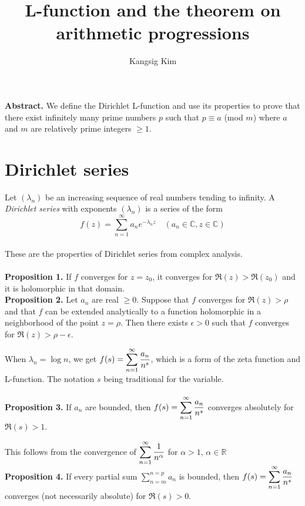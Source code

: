 \documentclass[11pt]{article}
\title{L-function and the theorem on arithmetic progressions}
\author{Kangsig Kim}
\begin{document}
\maketitle
\textbf{Abstract.} We define the Dirichlet L-function and use its properties to prove that there exist infinitely many prime numbers $p$ such that $p\equiv a$ (mod $m$) where $a$ and $m$ are relatively prime integers $\geq1$.
\vspace{10mm}

\section{Dirichlet series}
Let $(\lambda_n)$ be an increasing sequence of real numbers tending to infinity. A \textit{Dirichlet series} with exponents $(\lambda_n)$ is a series of the form
\begin{equation*}
    f(z)=\displaystyle\sum_{n=1}^{\infty} a_n e^{-\lambda_n z} \quad (a_n\in \mathbb{C}, z\in \mathbb{C})
\end{equation*}
\\
These are the properties of Dirichlet series from complex analysis.
\\
\\
\textbf{Proposition 1.}
If $f$ converges for $z=z_0$, it converges for $\Re(z)>\Re(z_0)$ and it is holomorphic in that domain.
\vspace{7mm}
\\
\textbf{Proposition 2.}
Let $a_n$ are real $\geq0$. Suppose that $f$ converges for $\Re(z)>\rho$ and that $f$ can be extended analytically to a function holomorphic in a neighborhood of the point $z=\rho$. Then there exists $\epsilon>0$ such that $f$ converges for $\Re(z)>\rho-\epsilon$.
\vspace{10mm}

When $\lambda_n=\log n$, we get $f(s)=\displaystyle\sum_{n=1}^{\infty} {a_n\over n^s}$, which is a form of the zeta function and L-function. The notation $s$ being traditional for the variable.
\\
\\
\textbf{Proposition 3.}
If $a_n$ are bounded, then $f(s)=\displaystyle\sum_{n=1}^{\infty} {a_n\over n^s}$ converges absolutely for $\Re(s)>1$.
\par
This follows from the convergence of $\displaystyle\sum_{n=1}^{\infty} {1\over n^\alpha}$ for $\alpha>1$, $\alpha\in\mathbb{R}$
\vspace{3mm}
\\
\textbf{Proposition 4.}
If every partial sum $\displaystyle\sum_{n=m}^{n=p} a_n$ is bounded, then $f(s)=\displaystyle\sum_{n=1}^{\infty} {a_n\over n^s}$ converges (not necessarily absolute) for $\Re(s)>0$.
\vspace{10mm}
\end{document}
